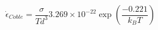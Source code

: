 \documentclass[review]{elsarticle}
\begin{document}
\begin{equation}
\label{eq:coble2}
\dot{\epsilon}_{Coble} =\frac{\sigma}{T d^{3}} 3.269 \times 10^{-22} \exp\left(\frac{-0.221}{k_{B} T}\right)
\end{equation}

\end{document}

